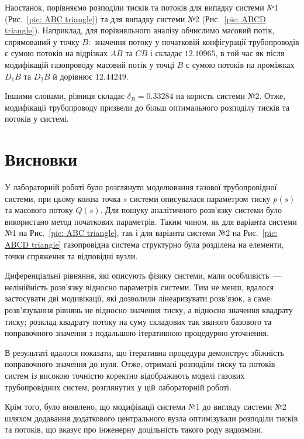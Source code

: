 \documentclass{mathreport}
\begin{document}
Наостанок, порівняємо розподіли тисків та потоків для випадку системи №1 (Рис.~\ref{pic: ABC triangle}) та для випадку системи №2 (Рис.~\ref{pic: ABCD triangle}). Наприклад, для порівняльного аналізу обчислимо масовий потік, спрямований у точку $B:$ значення потоку у початковій конфігурації трубопроводів є сумою потоків на відрізках $AB$ та $CB$ і складає $12.10965$, в той час як після модифікацій газопроводу масовий потік у точці $B$ є сумою потоків на проміжках $D_1B$ та $D_2B$ й дорівнює $12.44249$. 

Іншими словами, різниця складає $\delta_{B} = 0.33284$ на користь системи №2. Отже, модифікації трубопроводу призвели до більш оптимального розподілу тисків та потоків у системі.

\newpage
\section{Висновки}

У лабораторній роботі було розглянуто моделювання газової трубопровідної системи, при цьому кожна точка $s$ системи описувалася параметром тиску $p(s)$ та масового потоку $Q(s)$. Для пошуку аналітичного розв'язку системи було використано метод початкових параметрів. Таким чином, як для варіанта системи №1 на Рис.~\ref{pic: ABC triangle}, так і для варіанта системи №2 на Рис.~\ref{pic: ABCD triangle} газопровідна система структурно була розділена на елементи, точки спряження та відповідні вузли.

Диференціальні рівняння, які описують фізику системи, мали особливість~--- нелінійність розв'язку відносно параметрів системи. Тим не менш, вдалося застосувати дві модивікації, які дозволили лінеаризувати розв'язок, а саме: розв'язування рівнянь не відносно значення тиску, а відносно значення квадрату тиску; розклад квадрату потоку на суму складових так званого базового та поправочного значення з подальшою ітеративною процедурою уточнення.

В результаті вдалося показати, що ітеративна процедура демонструє збіжність поправочного значення до нуля. Отже, отримані розподіли тиску та потоків систем із високою точністю коректно відображають моделі газових трубопровідних систем, розглянутих у цій лабораторній роботі.

Крім того, було виявлено, що модифікації системи №1 до вигляду системи №2 шляхом додавання додаткового центрального вузла оптимізували розподіли тисків та потоків, що вказує про інженерну доцільність такого роду видозміни. 
\end{document}

